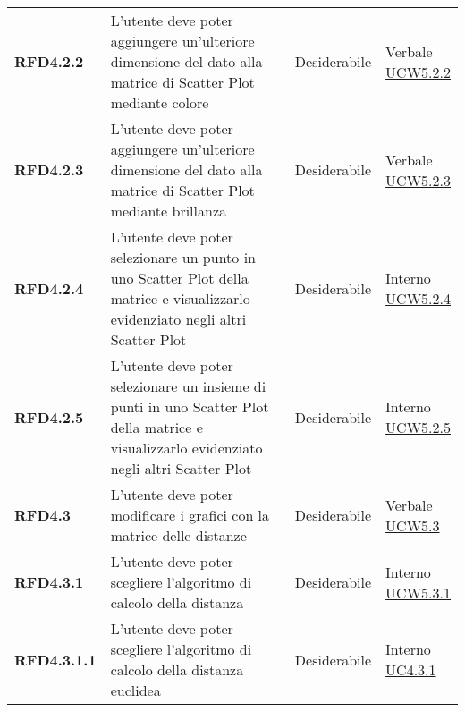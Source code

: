 \begin{longtable}[H]{| >{\raggedright\bfseries}m{20mm} | >{\raggedright}m{90mm} | >{\centering}m{25mm} | >{\centering\arraybackslash}m{30mm}|}
    RFD4.2.2
     & L'utente deve poter aggiungere un'ulteriore dimensione del dato alla matrice di Scatter Plot mediante colore
     & Desiderabile
     & \makecell{ Verbale                                                                                                \\ \hyperref[par:ucw5.2.2]{UCW5.2.2} }\\

    RFD4.2.3
     & L'utente deve poter aggiungere un'ulteriore dimensione del dato alla matrice di Scatter Plot mediante brillanza
     & Desiderabile
     & \makecell{ Verbale                                                                                                \\ \hyperref[par:ucw5.2.3]{UCW5.2.3} }\\

    RFD4.2.4
     & L'utente deve poter selezionare un punto in uno Scatter Plot della matrice e visualizzarlo evidenziato negli
    altri Scatter Plot
     & Desiderabile
     & \makecell{ Interno                                                                                                \\ \hyperref[par:ucw5.2.4]{UCW5.2.4} }\\

    RFD4.2.5
     & L'utente deve poter selezionare un insieme di punti in uno Scatter Plot della matrice e visualizzarlo evidenziato
    negli altri Scatter Plot
     & Desiderabile
     & \makecell{ Interno                                                                                                \\ \hyperref[par:ucw5.2.5]{UCW5.2.5} }\\

    RFD4.3
     & L'utente deve poter modificare i grafici con la matrice delle distanze
     & Desiderabile
     & \makecell{ Verbale                                                                                                \\ \hyperref[ssub:ucw5.3]{UCW5.3} }\\

    RFD4.3.1
     & L'utente deve poter scegliere l'algoritmo di calcolo della distanza
     & Desiderabile
     & \makecell{ Interno                                                                                                \\ \hyperref[par:ucw5.3.1]{UCW5.3.1} }\\

    RFD4.3.1.1
     & L'utente deve poter scegliere l'algoritmo di calcolo della distanza euclidea
     & Desiderabile
     & \makecell{ Interno                                                                                                \\ \hyperref[par:ucw4.3.1]{UC4.3.1} }\\


\end{longtable}
